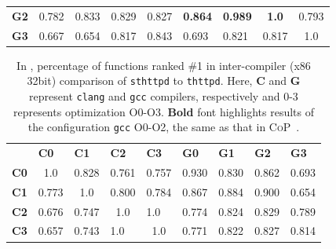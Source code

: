 \begin{table}[t]
\begin{tabular}{@{}lllllllll@{}}
\multicolumn{1}{l|}{\textbf{G2}} & \multicolumn{1}{l|}{0.782} & \multicolumn{1}{l|}{0.833} & \multicolumn{1}{l|}{0.829} & \multicolumn{1}{l|}{0.827} & \multicolumn{1}{l|}{\textbf{0.864}} & \multicolumn{1}{l|}{\textbf{0.989}} & \multicolumn{1}{c|}{\textbf{1.0}} & \multicolumn{1}{l|}{0.793} \\ \cmidrule(l){2-9}
\multicolumn{1}{l|}{\textbf{G3}} & \multicolumn{1}{l|}{0.667} & \multicolumn{1}{l|}{0.654} & \multicolumn{1}{l|}{0.817} & \multicolumn{1}{l|}{0.843} & \multicolumn{1}{l|}{0.693} & \multicolumn{1}{l|}{0.821} & \multicolumn{1}{l|}{0.817} & \multicolumn{1}{c|}{1.0} \\ \cmidrule(l){2-9}
\end{tabular}
\end{table}


\begin{table}[t]
\scriptsize
\centering
\caption{In \toolNew, percentage of functions ranked \#1 in inter-compiler (x86 32bit) comparison of \texttt{sthttpd} to \texttt{thttpd}. Here, \textbf{C} and \textbf{G} represent \texttt{clang} and \texttt{gcc} compilers, respectively and 0-3 represents optimization O0-O3. \textbf{Bold} font highlights results of the configuration \texttt{gcc} O0-O2, the same as that in \textsc{CoP}~\cite{luo2014semantics}. }
\label{tab:cross-code-inter2}
\begin{tabular}{@{}lllllllll@{}}
\textbf{} & \textbf{C0} & \textbf{C1} & \textbf{C2} & \textbf{C3} & \textbf{G0} & \textbf{G1} & \textbf{G2} & \textbf{G3} \\ \cmidrule(l){2-9}
\multicolumn{1}{l|}{\textbf{C0}} & \multicolumn{1}{c|}{1.0} & \multicolumn{1}{l|}{0.828} & \multicolumn{1}{l|}{0.761} & \multicolumn{1}{l|}{0.757} & \multicolumn{1}{l|}{0.930} & \multicolumn{1}{l|}{0.830} & \multicolumn{1}{l|}{0.862} & \multicolumn{1}{l|}{0.693} \\ \cmidrule(l){2-9}
\multicolumn{1}{l|}{\textbf{C1}} & \multicolumn{1}{l|}{0.773} & \multicolumn{1}{c|}{1.0} & \multicolumn{1}{l|}{0.800} & \multicolumn{1}{l|}{0.784} & \multicolumn{1}{l|}{0.867} & \multicolumn{1}{l|}{0.884} & \multicolumn{1}{l|}{0.900} & \multicolumn{1}{l|}{0.654} \\ \cmidrule(l){2-9}
\multicolumn{1}{l|}{\textbf{C2}} & \multicolumn{1}{l|}{0.676} & \multicolumn{1}{l|}{0.747} & \multicolumn{1}{c|}{1.0} & \multicolumn{1}{l|}{1.0} & \multicolumn{1}{l|}{0.774} & \multicolumn{1}{l|}{0.824} & \multicolumn{1}{l|}{0.829} & \multicolumn{1}{l|}{0.789} \\ \cmidrule(l){2-9}
\multicolumn{1}{l|}{\textbf{C3}} & \multicolumn{1}{l|}{0.657} & \multicolumn{1}{l|}{0.743} & \multicolumn{1}{l|}{1.0} & \multicolumn{1}{c|}{1.0} & \multicolumn{1}{l|}{0.771} & \multicolumn{1}{l|}{0.822} & \multicolumn{1}{l|}{0.827} & \multicolumn{1}{l|}{0.814} \\ \cmidrule(l){2-9}

\end{tabular}
\end{table}
